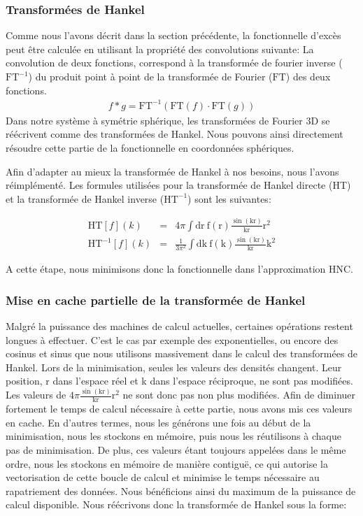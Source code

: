 \subsubsection{Transformées de Hankel}
Comme nous l'avons décrit dans la section précédente, la fonctionnelle d'excès peut être calculée en utilisant la propriété des convolutions suivante: La convolution de deux fonctions, correspond à la transformée de fourier inverse ($\mathrm{FT}^{-1}$) du produit point à point de la transformée de Fourier ($\mathrm{FT}$) des deux fonctions.
\begin{eqnarray}
f \ast g  = \mathrm{FT}^{-1}( \mathrm{FT}(f)\cdot\mathrm{FT}(g) )
\end{eqnarray}
Dans notre système à symétrie sphérique, les transformées de Fourier 3D se réécrivent comme des transformées de Hankel. Nous pouvons ainsi directement résoudre cette partie de la fonctionnelle en coordonnées sphériques.



Afin d'adapter au mieux la transformée de Hankel à nos besoins, nous l'avons réimplémenté. Les formules utilisées pour la transformée de Hankel directe (HT) et la transformée de Hankel inverse ($\mathrm{HT}^{-1}$) sont les suivantes:


\begin{eqnarray}
\mathrm{HT}[f](k) &=& 4\pi\int \mathrm{dr}\ \mathrm{f}(\mathrm{r})\frac{\sin(\mathrm{kr})}{\mathrm{kr}}\mathrm{r}^2\\
\mathrm{HT}^{-1}[f](k) &=& \frac{1}{3\pi^2}\int \mathrm{dk}\ \mathrm{f}(\mathrm{k})\frac{\sin(\mathrm{kr})}{\mathrm{kr}}\mathrm{k}^2
\end{eqnarray}

A cette étape, nous minimisons donc la fonctionnelle dans l'approximation HNC.  


\subsubsection{Mise en cache partielle de la transformée de Hankel}
Malgré la puissance des machines de calcul actuelles, certaines opérations restent longues à effectuer. C'est le cas par exemple des exponentielles, ou encore des cosinus et sinus que nous utilisons massivement dans le calcul des transformées de Hankel.
Lors de la minimisation, seules les valeurs des densités changent. Leur position, r dans l'espace réel et k dans l'espace réciproque, ne sont pas modifiées. Les valeurs de $4\pi\frac{\sin(\mathrm{kr})}{\mathrm{kr}}\mathrm{r}^2$ ne sont donc pas non plus modifiées. Afin de diminuer fortement le temps de calcul nécessaire à cette partie, nous avons mis ces valeurs en cache. En d'autres termes, nous les générons une fois au début de la minimisation, nous les stockons en mémoire, puis nous les réutilisons à chaque pas de minimisation. De plus, ces valeurs étant toujours appelées dans le même ordre, nous les stockons en mémoire de manière contiguë, ce qui autorise la vectorisation de cette boucle de calcul et minimise le temps nécessaire au rapatriement des données. Nous bénéficions ainsi du maximum de la puissance de calcul disponible. Nous réécrivons donc la transformée de Hankel sous la forme:

